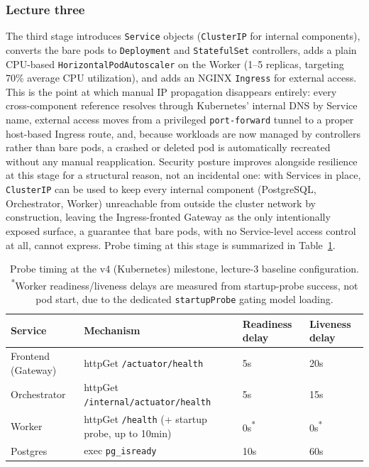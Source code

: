 \documentclass[twoside]{supsistudent}
\begin{document}
\subsubsection{Lecture three}
The third stage introduces \texttt{Service} objects (\texttt{ClusterIP} for internal components), converts the bare pods to \texttt{Deployment} and \texttt{StatefulSet} controllers, adds a plain CPU-based \texttt{HorizontalPodAutoscaler} on the Worker (1--5 replicas, targeting 70\% average CPU utilization), and adds an NGINX \texttt{Ingress} for external access. This is the point at which manual IP propagation disappears entirely: every cross-component reference resolves through Kubernetes' internal DNS by Service name, external access moves from a privileged \texttt{port-forward} tunnel to a proper host-based Ingress route, and, because workloads are now managed by controllers rather than bare pods, a crashed or deleted pod is automatically recreated without any manual reapplication. Security posture improves alongside resilience at this stage for a structural reason, not an incidental one: with Services in place, \texttt{ClusterIP} can be used to keep every internal component (PostgreSQL, Orchestrator, Worker) unreachable from outside the cluster network by construction, leaving the Ingress-fronted Gateway as the only intentionally exposed surface, a guarantee that bare pods, with no Service-level access control at all, cannot express. Probe timing at this stage is summarized in Table~\ref{tab:v4-probes}.

\begin{table}[h]
\centering
\begin{tabular}{|p{4.0cm}|p{5.5cm}|p{2.0cm}|p{1.5cm}|}
\hline
\textbf{Service} & \textbf{Mechanism} & \textbf{Readiness delay} & \textbf{Liveness delay} \\
\hline
Frontend (Gateway) & httpGet \texttt{/actuator/health} & 5s & 20s \\
\hline
Orchestrator & httpGet \texttt{/internal/actuator/health} & 5s & 15s \\
\hline
Worker & httpGet \texttt{/health} (+ startup probe, up to 10min) & 0s\textsuperscript{*} & 0s\textsuperscript{*} \\
\hline
Postgres & exec \texttt{pg\_isready} & 10s & 60s \\
\hline
\end{tabular}
\caption{Probe timing at the v4 (Kubernetes) milestone, lecture-3 baseline configuration. \textsuperscript{*}Worker readiness/liveness delays are measured from startup-probe success, not pod start, due to the dedicated \texttt{startupProbe} gating model loading.}
\label{tab:v4-probes}
\end{table}
\end{document}
